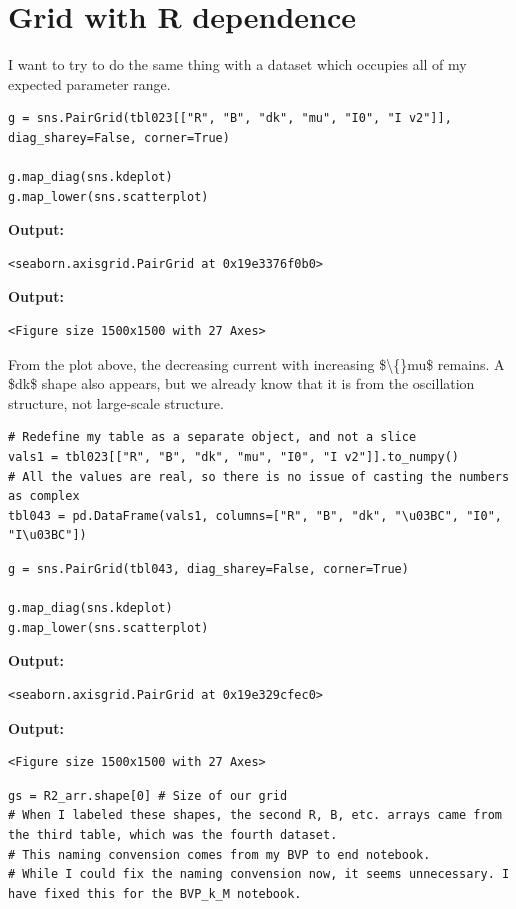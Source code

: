 \documentclass{article}
\begin{document}
\section{Grid with R dependence}

I want to try to do the same thing with a dataset which occupies all of my expected parameter range.

\begin{lstlisting}
g = sns.PairGrid(tbl023[["R", "B", "dk", "mu", "I0", "I v2"]], diag_sharey=False, corner=True)

g.map_diag(sns.kdeplot)
g.map_lower(sns.scatterplot)\end{lstlisting}

\textbf{Output:}\begin{verbatim}
<seaborn.axisgrid.PairGrid at 0x19e3376f0b0>
\end{verbatim}

\textbf{Output:}\begin{verbatim}
<Figure size 1500x1500 with 27 Axes>
\end{verbatim}

From the plot above, the decreasing current with increasing \$\textbackslash\{\}mu\$ remains. A \$dk\$ shape also appears, but we already know that it is from the oscillation structure, not large-scale structure.

\begin{lstlisting}
# Redefine my table as a separate object, and not a slice
vals1 = tbl023[["R", "B", "dk", "mu", "I0", "I v2"]].to_numpy()
# All the values are real, so there is no issue of casting the numbers as complex
tbl043 = pd.DataFrame(vals1, columns=["R", "B", "dk", "\u03BC", "I0", "I\u03BC"])\end{lstlisting}

\begin{lstlisting}
g = sns.PairGrid(tbl043, diag_sharey=False, corner=True)

g.map_diag(sns.kdeplot)
g.map_lower(sns.scatterplot)\end{lstlisting}

\textbf{Output:}\begin{verbatim}
<seaborn.axisgrid.PairGrid at 0x19e329cfec0>
\end{verbatim}

\textbf{Output:}\begin{verbatim}
<Figure size 1500x1500 with 27 Axes>
\end{verbatim}

\begin{lstlisting}
gs = R2_arr.shape[0] # Size of our grid
# When I labeled these shapes, the second R, B, etc. arrays came from the third table, which was the fourth dataset. 
# This naming convension comes from my BVP to end notebook.
# While I could fix the naming convension now, it seems unnecessary. I have fixed this for the BVP_k_M notebook.\end{lstlisting}
\end{document}
